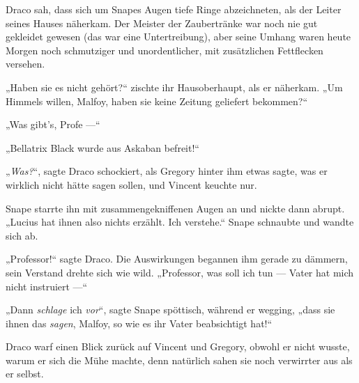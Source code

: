 Draco sah, dass sich um Snapes Augen tiefe Ringe abzeichneten, als der Leiter seines Hauses näherkam. Der Meister der Zaubertränke war noch nie gut gekleidet gewesen (das war eine Untertreibung), aber seine Umhang waren heute Morgen noch schmutziger und unordentlicher, mit zusätzlichen Fettflecken versehen.

„Haben sie es nicht gehört?“ zischte ihr Hausoberhaupt, als er näherkam.
„Um Himmels willen, Malfoy, haben sie keine Zeitung geliefert bekommen?“

„Was gibt’s, Profe —“

„Bellatrix Black wurde aus Askaban befreit!“

„\emph{Was?}“, sagte Draco schockiert, als Gregory hinter ihm etwas sagte, was er wirklich nicht hätte sagen sollen, und Vincent keuchte nur.

Snape starrte ihn mit zusammengekniffenen Augen an und nickte dann abrupt.
„Lucius hat ihnen also nichts erzählt. Ich verstehe.“ Snape schnaubte und wandte sich ab.

„Professor!“ sagte Draco. Die Auswirkungen begannen ihm gerade zu dämmern, sein Verstand drehte sich wie wild.
„Professor, was soll ich tun — Vater hat mich nicht instruiert —“

„Dann \emph{schlage} ich \emph{vor}“, sagte Snape spöttisch, während er wegging, „dass sie ihnen das \emph{sagen}, Malfoy, so wie es ihr Vater beabsichtigt hat!“

Draco warf einen Blick zurück auf Vincent und Gregory, obwohl er nicht wusste, warum er sich die Mühe machte, denn natürlich sahen sie noch verwirrter aus als er selbst.


